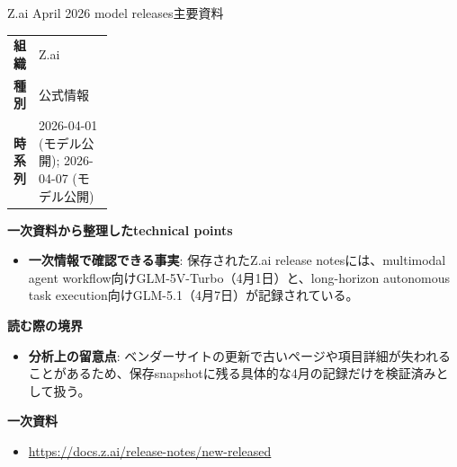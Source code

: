 \begin{technicalnote}{Z.ai April 2026 model releases}{主要資料}
\begingroup
\begin{tabularx}{\linewidth}{@{}>{\bfseries}p{0.22\linewidth}X@{}}
組織 & Z.ai \\
種別 & 公式情報 \\
時系列 & 2026-04-01 (モデル公開); 2026-04-07 (モデル公開) \\
\end{tabularx}
\smallskip
{\bfseries 一次資料から整理したtechnical points}
\begin{itemize}[leftmargin=1.5em,itemsep=0.35em]
\item \textbf{一次情報で確認できる事実}: 保存されたZ.ai release notesには、multimodal agent workflow向けGLM-5V-Turbo（4月1日）と、long-horizon autonomous task execution向けGLM-5.1（4月7日）が記録されている。
\end{itemize}
\begin{minipage}{\linewidth}
{\bfseries 読む際の境界}
\begin{itemize}[leftmargin=1.5em,itemsep=0.35em]
\item \textbf{分析上の留意点}: ベンダーサイトの更新で古いページや項目詳細が失われることがあるため、保存snapshotに残る具体的な4月の記録だけを検証済みとして扱う。
\end{itemize}
\begin{samepage}
{\bfseries 一次資料}
\begingroup\sloppy
\begin{itemize}[leftmargin=1.5em,itemsep=0.25em]
\item {\scriptsize\url{https://docs.z.ai/release-notes/new-released}}
\end{itemize}
\endgroup
\end{samepage}
\end{minipage}
\endgroup
\end{technicalnote}
\medskip

